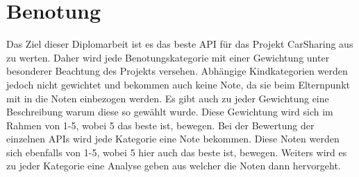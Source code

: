 	\section{Benotung}
		Das Ziel dieser Diplomarbeit ist es das beste API für das Projekt CarSharing aus zu werten. Daher wird jede Benotungskategorie mit einer Gewichtung unter besonderer Beachtung des Projekts versehen. Abhängige Kindkategorien werden jedoch nicht gewichtet und bekommen auch keine Note, da sie beim Elternpunkt mit in die Noten einbezogen werden. Es gibt auch zu jeder Gewichtung eine Beschreibung warum diese so gewählt wurde. Diese Gewichtung wird sich im Rahmen von 1-5, wobei 5 das beste ist, bewegen. Bei der Bewertung der einzelnen APIs wird jede Kategorie eine Note bekommen. Diese Noten werden sich ebenfalls von 1-5, wobei 5 hier auch das beste ist, bewegen. Weiters wird es zu jeder Kategorie eine Analyse geben aus welcher  die Noten dann hervorgeht.
		\pagebreak
		
